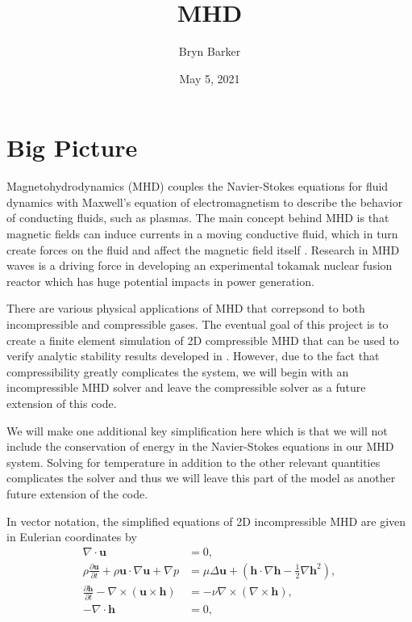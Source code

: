 \documentclass{article}
\begin{document}
\title{MHD}
\author{Bryn Barker}
\date{May 5, 2021}

\maketitle

\section*{Big Picture}
Magnetohydrodynamics (MHD) couples the Navier-Stokes equations for fluid dynamics with Maxwell's equation of electromagnetism to describe the behavior of conducting fluids, such as plasmas.
The main concept behind MHD is that magnetic fields can induce currents in a moving conductive fluid,
which in turn create forces on the fluid and affect the magnetic field itself \cite{ASThesis}. %
Research in MHD waves is a driving force in developing an experimental tokamak nuclear fusion reactor which has huge potential impacts in power generation.

There are various physical applications of MHD that correpsond to both incompressible and compressible gases. The eventual goal of this project is to create a finite element simulation of 2D compressible MHD that can be used to verify analytic stability results developed in \cite{bryn}. However, due to the fact that compressibility greatly complicates the system, we will begin with an incompressible MHD solver and leave the compressible solver as a future extension of this code. 

We will make one additional key simplification here which is that we will not include the conservation of energy in the Navier-Stokes equations in our MHD system. Solving for temperature in addition to the other relevant quantities complicates the solver and thus we will leave this part of the model as another future extension of the code. 

In vector notation, the simplified equations of 2D incompressible MHD are given in Eulerian coordinates by
\begin{align*}
    \nabla \cdot \boldsymbol{u} &= 0,\\
    \rho \frac{\partial  \boldsymbol{u}}{\partial t} + \rho \boldsymbol{u} \cdot \nabla \boldsymbol{u} + \nabla p &= \mu \Delta \boldsymbol{u}+ \left(\boldsymbol{h}\cdot \nabla \boldsymbol{h} - \frac{1}{2}\nabla \boldsymbol{h}^2\right),\\
    \frac{\partial \boldsymbol{h} }{\partial t} - \nabla \times (\boldsymbol{u}\times \boldsymbol{h}) &= -\nu \nabla \times (\nabla \times \boldsymbol{h}), \\
    -\nabla \cdot \boldsymbol{h} &= 0,
\end{align*}
\end{document}
